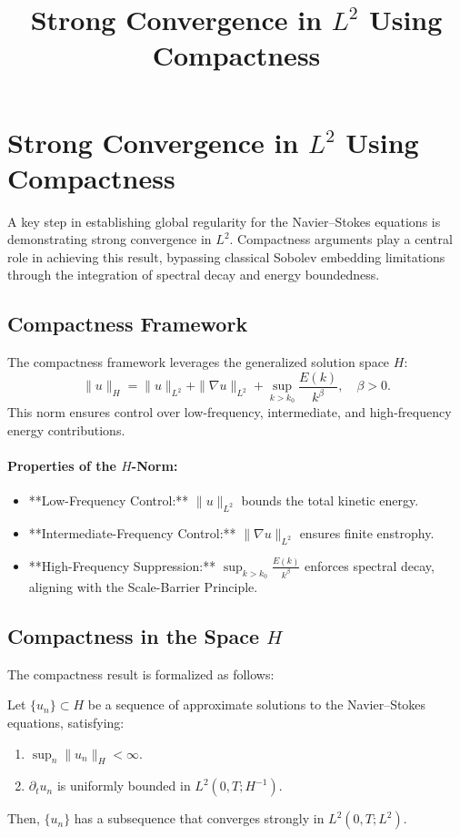\documentclass[12pt]{article}
\theoremstyle{definition}
\begin{document}
\title{Strong Convergence in $L^2$ Using Compactness}
\author{}
\date{}
\maketitle

\section{Strong Convergence in $L^2$ Using Compactness}

A key step in establishing global regularity for the Navier--Stokes equations is demonstrating strong convergence in $L^2$. Compactness arguments play a central role in achieving this result, bypassing classical Sobolev embedding limitations through the integration of spectral decay and energy boundedness.

\subsection{Compactness Framework}
The compactness framework leverages the generalized solution space $H$:
\begin{equation}
\|u\|_H = \|u\|_{L^2} + \|\nabla u\|_{L^2} + \sup_{k > k_0} \frac{E(k)}{k^\beta}, \quad \beta > 0.
\end{equation}
This norm ensures control over low-frequency, intermediate, and high-frequency energy contributions.

\paragraph{Properties of the $H$-Norm:}
\begin{itemize}
    \item **Low-Frequency Control:** $\|u\|_{L^2}$ bounds the total kinetic energy.
    \item **Intermediate-Frequency Control:** $\|\nabla u\|_{L^2}$ ensures finite enstrophy.
    \item **High-Frequency Suppression:** $\sup_{k > k_0} \frac{E(k)}{k^\beta}$ enforces spectral decay, aligning with the Scale-Barrier Principle.
\end{itemize}

\subsection{Compactness in the Space $H$}
The compactness result is formalized as follows:

\begin{theorem}[Compactness in $L^2$]
Let $\{u_n\} \subset H$ be a sequence of approximate solutions to the Navier--Stokes equations, satisfying:
\begin{enumerate}
    \item $\sup_n \|u_n\|_H < \infty$.
    \item $\partial_t u_n$ is uniformly bounded in $L^2(0, T; H^{-1})$.
\end{enumerate}
Then, $\{u_n\}$ has a subsequence that converges strongly in $L^2(0, T; L^2)$.
\end{theorem}
\end{document}
